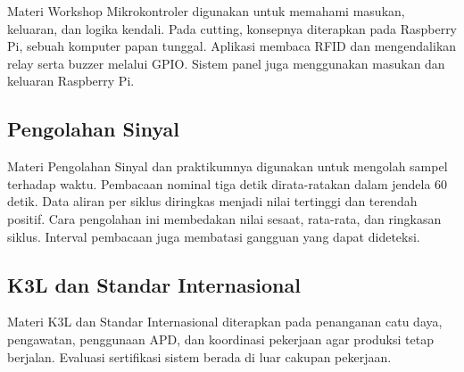 Materi Workshop Mikrokontroler digunakan untuk memahami masukan, keluaran, dan logika kendali. Pada cutting, konsepnya diterapkan pada Raspberry Pi, sebuah komputer papan tunggal. Aplikasi membaca RFID dan mengendalikan relay serta buzzer melalui GPIO. Sistem panel juga menggunakan masukan dan keluaran Raspberry Pi.

\subsection{Pengolahan Sinyal}

Materi Pengolahan Sinyal dan praktikumnya digunakan untuk mengolah sampel terhadap waktu. Pembacaan nominal tiga detik dirata-ratakan dalam jendela 60 detik. Data aliran per siklus diringkas menjadi nilai tertinggi dan terendah positif. Cara pengolahan ini membedakan nilai sesaat, rata-rata, dan ringkasan siklus. Interval pembacaan juga membatasi gangguan yang dapat dideteksi.

\subsection{K3L dan Standar Internasional}

Materi K3L dan Standar Internasional diterapkan pada penanganan catu daya, pengawatan, penggunaan APD, dan koordinasi pekerjaan agar produksi tetap berjalan. Evaluasi sertifikasi sistem berada di luar cakupan pekerjaan.
\endgroup
